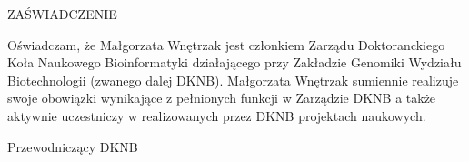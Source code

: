 \documentclass[12pt,firstpage,polish,a4paper]{letter}
\date{Wrocław, \today}
\newcommand{\memberName}{Małgorzata Wnętrzak }
\begin{document}
 
\begin{letter}{}{}
 
\begin{center}\opening{ZAŚWIADCZENIE}
\end{center}

Oświadczam, że \memberName jest członkiem Zarządu Doktoranckiego Koła Naukowego 
Bioinformatyki działającego przy Zakładzie Genomiki Wydziału Biotechnologii 
(zwanego dalej DKNB). \memberName sumiennie realizuje swoje obowiązki wynikające 
z pełnionych funkcji w Zarządzie DKNB a także aktywnie uczestniczy w 
realizowanych przez DKNB projektach naukowych.

\vfill

\begin{flushright}Przewodniczący DKNB
\end{flushright}
\end{letter}
\end{document}
